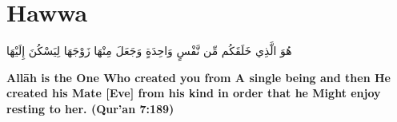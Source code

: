 \chapter{Hawwa}
\begin{center}
    {\Huge    
        \begin{Arabic}
            هُوَ الَّذِي خَلَقَكُم مِّن نَّفْسٍ وَاحِدَةٍ وَجَعَلَ مِنْهَا زَوْجَهَا لِيَسْكُنَ إِلَيْهَا
        \end{Arabic}
    }    
\end{center}
\vspace*{\fill}
\vspace{3cm}
\begin{center}
    \large \textbf{Allāh is the One Who created you from A single being and then He created his Mate [Eve] from his kind in order that he Might enjoy resting to her. (Qur'an 7:189)}
\end{center}
